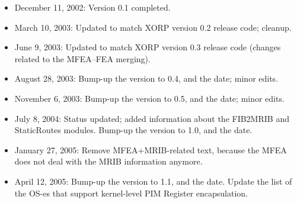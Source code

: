 \documentclass[11pt]{article}
\begin{document}
\begin{itemize}

  \item December 11, 2002: Version 0.1 completed.

  \item March 10, 2003: Updated to match XORP version 0.2 release code;
  cleanup.

  \item June 9, 2003: Updated to match XORP version 0.3 release code
  (changes related to the MFEA--FEA merging).

  \item August 28, 2003: Bump-up the version to 0.4, and the date;
  minor edits.

  \item November 6, 2003: Bump-up the version to 0.5, and the date;
  minor edits.

  \item July 8, 2004: Status updated; added information about the FIB2MRIB
  and StaticRoutes modules. Bump-up the version to 1.0, and the date.

  \item January 27, 2005: Remove MFEA+MRIB-related text, because the MFEA
  does not deal with the MRIB information anymore.

  \item April 12, 2005: Bump-up the version to 1.1, and the date.
  Update the list of the OS-es that support kernel-level PIM Register
  encapsulation.

\end{itemize}





\end{document}
